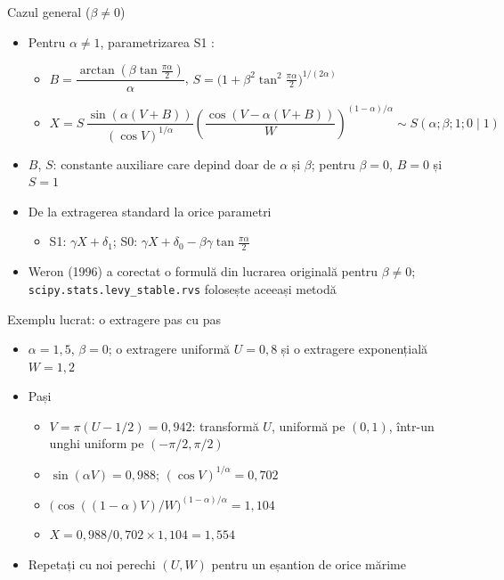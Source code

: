 \begin{frame}{Cazul general ($\beta \ne 0$)}
\itemsize{\small}
\begin{itemize}
    \item Pentru $\alpha \ne 1$, parametrizarea S1 :
    \begin{itemize}
        \item $B = \dfrac{\arctan(\beta\tan\frac{\pi\alpha}{2})}{\alpha}$, \quad $S = \Big(1 + \beta^2\tan^2\frac{\pi\alpha}{2}\Big)^{1/(2\alpha)}$
        \item $X = S\,\dfrac{\sin(\alpha(V + B))}{(\cos V)^{1/\alpha}} \left(\dfrac{\cos(V - \alpha(V + B))}{W}\right)^{(1 - \alpha)/\alpha} \sim S(\alpha; \beta; 1; 0 \mid 1)$
    \end{itemize}
    \item $B$, $S$: constante auxiliare care depind doar de $\alpha$ și $\beta$; pentru $\beta = 0$, $B = 0$ și $S = 1$
    \item De la extragerea standard la orice parametri
    \begin{itemize}
        \item S1: $\gamma X + \delta_1$; S0: $\gamma X + \delta_0 - \beta\gamma\tan\frac{\pi\alpha}{2}$
    \end{itemize}
    \item Weron (1996) a corectat o formulă din lucrarea originală pentru $\beta \ne 0$; \texttt{scipy.stats.levy\_stable.rvs} folosește aceeași metodă
\end{itemize}
\end{frame}

\begin{frame}{Exemplu lucrat: o extragere pas cu pas}
\itemsize{\small}
\begin{itemize}
    \item $\alpha = 1{,}5$, $\beta = 0$; o extragere uniformă $U = 0{,}8$ și o extragere exponențială $W = 1{,}2$
    \item Pași
    \begin{itemize}
        \item $V = \pi(U - 1/2) = 0{,}942$: transformă $U$, uniformă pe $(0, 1)$, într-un unghi uniform pe $(-\pi/2, \pi/2)$
        \item $\sin(\alpha V) = 0{,}988$; $(\cos V)^{1/\alpha} = 0{,}702$
        \item $\big(\cos((1 - \alpha)V)/W\big)^{(1 - \alpha)/\alpha} = 1{,}104$
        \item $X = 0{,}988/0{,}702 \times 1{,}104 = 1{,}554$
    \end{itemize}
    \item Repetați cu noi perechi $(U, W)$ pentru un eșantion de orice mărime
\end{itemize}
\end{frame}

